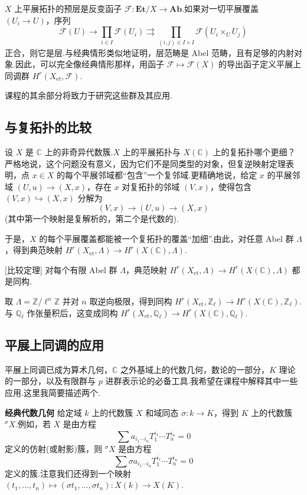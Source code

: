 $X$ 上平展拓扑的预层是反变函子 $\mathcal{F} \colon \mathbf{Et}/X \to \mathbf{Ab}$.如果对一切平展覆盖 $(U_i \to U)$，序列
\[
\mathcal{F}(U) \to \prod_{i \in I} \mathcal{F}(U_i) \rightrightarrows \prod_{(i,j) \in I \times I} \mathcal{F}(U_i \times_{U} U_j)
\]
正合，则它是层.与经典情形类似地证明，层范畴是 Abel 范畴，且有足够的内射对象.因此，可以完全像经典情形那样，用函子 $\mathcal{F} \mapsto \mathcal{F}(X)$ 的导出函子定义平展上同调群 $H^{r}(X_{\mathrm{et}}, \mathcal{F})$.

课程的其余部分将致力于研究这些群及其应用.

\subsection*{与复拓扑的比较}

设 $X$ 是 $\mathbb{C}$ 上的非奇异代数簇.$X$ 上的平展拓扑与 $X(\mathbb{C})$ 上的复拓扑哪个更细？严格地说，这个问题没有意义，因为它们不是同类型的对象，但复逆映射定理表明，点 $x \in X$ 的每个平展邻域都``包含''一个复邻域.更精确地说，给定 $x$ 的平展邻域 $(U, u) \to (X, x)$，存在 $x$ 对复拓扑的邻域 $(V, x)$，使得包含 $(V, x) \hookrightarrow (X, x)$ 分解为
\[
(V, x) \to (U, u) \to (X, x)
\]
(其中第一个映射是复解析的，第二个是代数的).

于是，$X$ 的每个平展覆盖都能被一个复拓扑的覆盖``加细''.由此，对任意 Abel 群 $\Lambda$，得到典范映射 $H^{r}(X_{\mathrm{et}}, \Lambda) \to H^{r}(X(\mathbb{C}), \Lambda)$.

\begin{theorem}\label{thm:1.4}[比较定理]
对每个有限 Abel 群 $\Lambda$，典范映射 $H^{r}(X_{\mathrm{et}}, \Lambda) \to H^{r}(X(\mathbb{C}), \Lambda)$ 都是同构.
\end{theorem}

取 $\Lambda = \mathbb{Z}/\ell^{n}\mathbb{Z}$ 并对 $n$ 取逆向极限，得到同构 $H^{r}(X_{\mathrm{et}}, \mathbb{Z}_{\ell}) \to H^{r}(X(\mathbb{C}), \mathbb{Z}_{\ell})$.与 $\mathbb{Q}_{\ell}$ 作张量积后，这变成同构 $H^{r}(X_{\mathrm{et}}, \mathbb{Q}_{\ell}) \to H^{r}(X(\mathbb{C}), \mathbb{Q}_{\ell})$.

\subsection*{平展上同调的应用}

平展上同调已成为算术几何，$\mathbb{C}$ 之外基域上的代数几何，数论的一部分，$K$ 理论的一部分，以及有限群与 $p$ 进群表示论的必备工具.我希望在课程中解释其中一些应用.这里我简要描述两个.

\textbf{经典代数几何} 给定域 $k$ 上的代数簇 $X$ 和域同态 $\sigma \colon k \to K$，得到 $K$ 上的代数簇 $^{\sigma}X$.例如，若 $X$ 是由方程
\[
\sum a_{i_1 \cdots i_n} T^{i_1}_{1} \cdots T^{i_n}_{n} = 0
\]
定义的仿射(或射影)簇，则 $^{\sigma}X$ 是由方程
\[
\sum \sigma a_{i_1 \cdots i_n} T^{i_1}_{1} \cdots T^{i_n}_{n} = 0
\]
定义的簇.注意我们还得到一个映射 $(t_1, \ldots, t_n) \mapsto (\sigma t_1, \ldots, \sigma t_n) \colon X(k) \to X(K)$.

